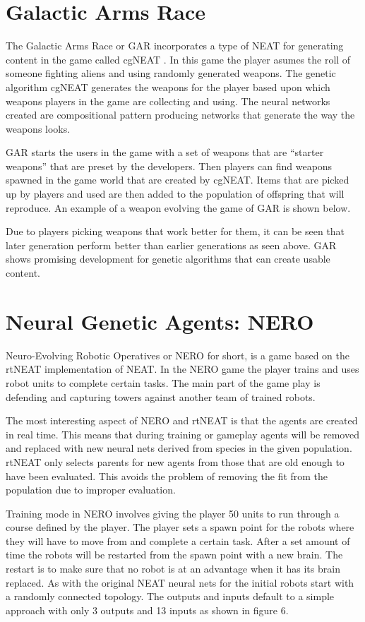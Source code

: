 \documentclass[12pt]{ucthesis} \newif\ifpdf \ifx\pdfoutput\undefined
\begin{document}
\section{Galactic Arms Race}

The Galactic Arms Race or GAR incorporates a type of NEAT for generating content
in the game called cgNEAT \cite{hastings2009evolving}. In this game the player
asumes the roll of someone fighting aliens and using randomly generated weapons.
The genetic algorithm cgNEAT generates the weapons for the player based
upon which weapons players in the game are collecting and using. The
neural networks created are compositional pattern producing networks that generate the way the weapons looks\cite{hastings2009evolving}.

GAR starts the users in the game with a set of weapons that are “starter
weapons” that are preset by the developers. Then players can find weapons
spawned in the game world that are created by cgNEAT. Items that are picked up by
players and used are then added to the population of offspring that will
reproduce. An example of a weapon evolving the game of GAR is shown
below\cite{hastings2009evolving}.

Due to players picking weapons that work better for them, it can be seen that
later generation perform better than earlier generations as seen above. GAR
shows promising development for genetic algorithms that can create usable
content.

\section{Neural Genetic Agents: NERO}
  
Neuro-Evolving Robotic Operatives or NERO for short, is a game based on the
rtNEAT implementation of NEAT\cite{stanley:cig05}. In the NERO game the player
trains and uses robot units to complete certain tasks. The main part of the game play is
defending and capturing towers against another team of trained robots.

The most interesting aspect of NERO and rtNEAT is that the agents are created in
real time. This means that during training or gameplay agents will be removed
and replaced with new neural nets derived from species in the given population.
rtNEAT only selects parents for new agents from those that are old enough to
have been evaluated. This avoids the problem of removing the fit from the
population due to improper evaluation.

Training mode in NERO involves giving the player 50 units to run through a
course defined by the player. The player sets a spawn point for the robots where
they will have to move from and complete a certain task. After a set amount of
time the robots will be restarted from the spawn point with a new brain. The
restart is to make sure that no robot is at an advantage when it has its brain
replaced. As with the original NEAT neural nets for the initial robots start
with a randomly connected topology. The outputs and inputs default to a simple
approach with only 3 outputs and 13 inputs as shown in figure 6.
\end{document}

